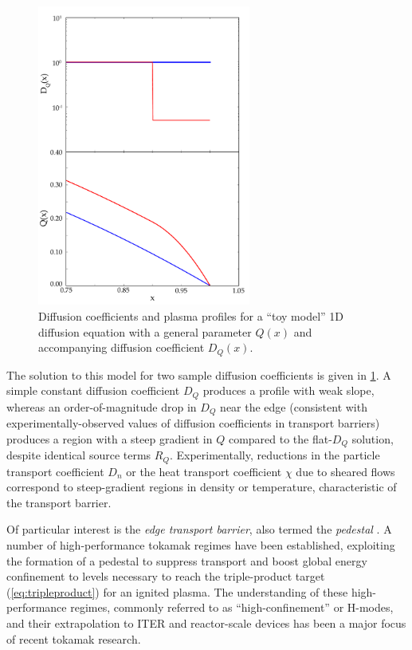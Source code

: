  \begin{figure}
  \includegraphics[width=70mm]{graphics/Introduction/transport.pdf}
  \caption{Diffusion coefficients and plasma profiles for a ``toy model'' 1D diffusion equation with a general parameter $Q(x)$ and accompanying diffusion coefficient $D_Q(x)$.}
  \label{fig:intro_transport}
 \end{figure}

\noindent The solution to this model for two sample diffusion coefficients is given in \cref{fig:intro_transport}.  A simple constant diffusion coefficient $D_Q$ produces a profile with weak slope, whereas an order-of-magnitude drop in $D_Q$ near the edge (consistent with experimentally-observed values of diffusion coefficients in transport barriers) produces a region with a steep gradient in $Q$ compared to the flat-$D_Q$ solution, despite identical source terms $R_Q$.  Experimentally, reductions in the particle transport coefficient $D_n$ or the heat transport coefficient $\chi$ due to sheared flows correspond to steep-gradient regions in density or temperature, characteristic of the transport barrier.

Of particular interest is the \emph{edge transport barrier}, also termed the \emph{pedestal} \cite{Wagner1982,Greenwald1997}.  A number of high-performance tokamak regimes have been established, exploiting the formation of a pedestal to suppress transport and boost global energy confinement to levels necessary to reach the triple-product target (\cref{eq:tripleproduct}) for an ignited plasma.  The understanding of these high-performance regimes, commonly referred to as ``high-confinement'' or H-modes, and their extrapolation to ITER and reactor-scale devices has been a major focus of recent tokamak research.

